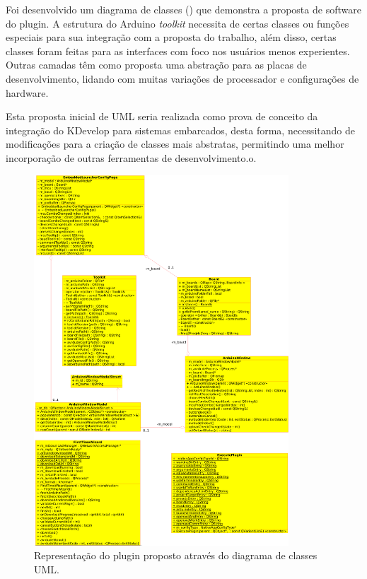 Foi desenvolvido um diagrama de classes () que demonstra a proposta de software do plugin. A estrutura do Arduino \textit{toolkit} necessita de certas classes ou funções especiais para sua integração com a proposta do trabalho, além disso, certas classes foram feitas para as interfaces com foco nos usuários menos experientes. Outras camadas têm como proposta uma abstração para as placas de desenvolvimento, lidando com muitas variações de processador e configurações de hardware. 

Esta proposta inicial de UML seria realizada como prova de conceito da integração do KDevelop para sistemas embarcados, desta forma, necessitando de modificações para a criação de classes mais abstratas, permitindo uma melhor incorporação de outras ferramentas de desenvolvimento.o.

\begin{figure}[!htb]
  \centering
  \includegraphics[width=0.85\textwidth]{figuras/uml.png}
  \caption[UML proposto]{Representação do plugin proposto através do diagrama de classes UML.}
  \label{fig:uml}
\end{figure}



